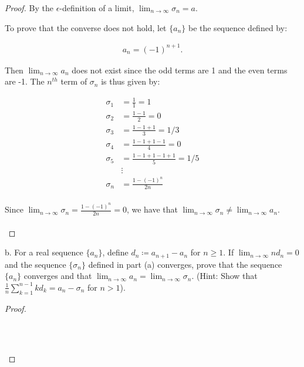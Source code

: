 \begin{proof}
        By the $\epsilon$-definition of a limit,
        $\lim_{n \rightarrow \infty}{\sigma_n} = a$.

        To prove that the converse does not hold, let $\{a_n\}$ be the
        sequence defined by:

        \begin{align*}
            a_n = (-1)^{n+1}.
        \end{align*}
        
        Then $\lim_{n \rightarrow \infty}{a_n}$ does not exist since the odd
        terms are 1 and the even terms are -1. The $n^{th}$ term of
        $\sigma_n$ is thus given by:

        \begin{align*}
            \sigma_1 &= \frac{1}{1} = 1 \\
            \sigma_2 &= \frac{1 - 1}{2} = 0 \\
            \sigma_3 &= \frac{1 - 1 + 1}{3} = 1/3 \\
            \sigma_4 &= \frac{1 - 1 + 1 - 1}{4} = 0 \\
            \sigma_5 &= \frac{1 - 1 + 1 - 1 + 1}{5} = 1/5 \\
                     &\vdots \\
            \sigma_n &= \frac{1 - (-1)^n}{2n} \\
        \end{align*}

        Since $\lim_{n \rightarrow \infty}{\sigma_n = \frac{1 - (-1)^n}{2n}} = 0$,
        we have that
        $\lim_{n \rightarrow \infty}{\sigma_n} \neq \lim_{n \rightarrow \infty}{a_n}$.
        \\\\
    \end{proof}
    \pagebreak

b.  For a real sequence $\{a_n\}$, define $d_n \coloneqq a_{n+1} - a_n$ for
    $n \ge 1$. If $\lim_{n \rightarrow \infty}{nd_n} = 0$ and the sequence
    $\{\sigma_n\}$ defined in part (a) converges, prove that the sequence
    $\{a_n\}$ converges and that
    $\lim_{n \rightarrow \infty}{a_n} = \lim_{n \rightarrow \infty}{\sigma_n}$.
    (Hint: Show that $\frac{1}{n}\sum\limits_{k=1}^{n-1}{kd_k} = a_n - \sigma_n$
     for $n > 1$).

    \begin{proof}\renewcommand{\qedsymbol}{}\ \\\\

        \begin{align*}
        \end{align*}
        \\\\
    \end{proof}